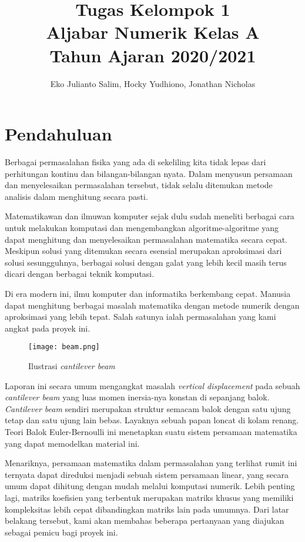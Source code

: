 \documentclass[12pt, a4paper, onecolumn, oneside, final]{report}
\title{Tugas Kelompok 1\\Aljabar Numerik Kelas A\\Tahun Ajaran 2020/2021}
\author{Eko Julianto Salim, Hocky Yudhiono, Jonathan Nicholas}
\begin{document}
\maketitle

\section*{Pendahuluan}

Berbagai permasalahan fisika yang ada di sekeliling kita tidak lepas dari perhitungan kontinu dan bilangan-bilangan nyata. Dalam menyusun persamaan dan menyelesaikan permasalahan tersebut, tidak selalu ditemukan metode analisis dalam menghitung secara pasti.

Matematikawan dan ilmuwan komputer sejak dulu sudah meneliti berbagai cara untuk melakukan komputasi dan mengembangkan algoritme-algoritme yang dapat menghitung dan menyelesaikan permasalahan matematika secara cepat. Meskipun solusi yang ditemukan secara esensial merupakan aproksimasi dari solusi sesungguhnya, berbagai solusi dengan galat yang lebih kecil masih terus dicari dengan berbagai teknik komputasi.

Di era modern ini, ilmu komputer dan informatika berkembang cepat. Manusia dapat menghitung berbagai masalah matematika dengan metode numerik dengan aproksimasi yang lebih tepat. Salah satunya ialah permasalahan yang kami angkat pada proyek ini.

\begin{figure}[h]
  \centering
    \texttt{[image: beam.png]}
  \caption{Ilustrasi \textit{cantilever beam}}
\end{figure}

Laporan ini secara umum mengangkat masalah \textit{vertical displacement} pada sebuah \textit{cantilever beam} yang luas momen inersia-nya konstan di sepanjang balok. \textit{Cantilever beam} sendiri merupakan struktur semacam balok dengan satu ujung tetap dan satu ujung lain bebas. Layaknya sebuah papan loncat di kolam renang. Teori Balok Euler-Bernoulli ini menetapkan suatu sistem persamaan matematika yang dapat memodelkan material ini.

Menariknya, persamaan matematika dalam permasalahan yang terlihat rumit ini ternyata dapat direduksi menjadi sebuah sistem persamaan linear, yang secara umum dapat dihitung dengan mudah melalui komputasi numerik. Lebih penting lagi, matriks koefisien yang terbentuk merupakan matriks khusus yang memiliki kompleksitas lebih cepat dibandingkan matriks lain pada umumnya. Dari latar belakang tersebut, kami akan membahas beberapa pertanyaan yang diajukan sebagai pemicu bagi proyek ini.
\end{document}
